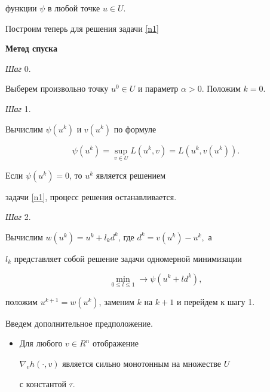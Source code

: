 функции $\psi$ в любой точке $u \in U$.





Построим теперь для решения задачи \ref{n1}


\medskip





{\bf Метод спуска}





{\it Шаг} 0. 


Выберем произвольно точку $u^0 \in U$ и параметр $\alpha >0$. Положим $k=0$.





{\it Шаг} 1. 


Вычислим $\psi(u^k)$ и $v(u^k)$ по формуле 


$$


\psi(u^k)= \sup \limits_{v \in U} L(u^k,v) = L(u^k, v(u^k)).


$$ 


Если $\psi(u^k)=0$, то $u^k$ является решением 


задачи \ref{n1}, процесс решения останавливается.





{\it Шаг} 2. 


Вычислим $w(u^{k})=u^k+l_kd^k$, где $d^k=v(u^k)-u^k,$ а


$l_k$ представляет собой решение задачи одномерной минимизации


$$


\min \limits_{0 \le l \le 1} 


\longrightarrow \psi(u^k+ld^k),


$$


положим $u^{k+1}=w(u^k)$, заменим $k$ на $k+1$ и перейдем к шагу 1.


\medskip





Введем дополнительное предположение.


\begin{itemize}


\item[(A3)] Для любого $v \in R^n$ отображение 


$\nabla_v h(\cdot, v)$ является сильно монотонным на множестве $U$


с константой $\tau.$


\end{itemize}





